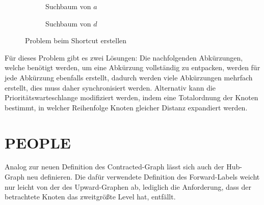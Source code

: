 \begin{figure}[h!]
\begin{subfigure}[b]{0.49\textwidth}
    \caption{Suchbaum von $a$}
  \end{subfigure}
  \hfill
  \begin{subfigure}[b]{0.49\textwidth}
    \centering
    \caption{Suchbaum von $d$}
  \end{subfigure}
  \caption{Problem beim Shortcut erstellen}
  \label{ch:fig:problem_shortcut}
\end{figure}

Für dieses Problem gibt es zwei Lösungen:
Die nachfolgenden Abkürzungen, welche benötigt werden, um eine Abkürzung vollständig zu entpacken, werden für jede Abkürzung ebenfalls erstellt, dadurch werden viele Abkürzungen mehrfach erstellt, dies muss daher synchronisiert werden.
Alternativ kann die Prioritätswarteschlange modifiziert werden, indem eine Totalordnung der Knoten bestimmt, in welcher Reihenfolge Knoten gleicher Distanz expandiert werden.

\section{PEOPLE}

Analog zur neuen Definition des Contracted-Graph lässt sich auch der Hub-Graph neu definieren.
Die dafür verwendete Definition des Forward-Labels weicht nur leicht von der des Upward-Graphen ab, lediglich die Anforderung, dass der betrachtete Knoten das zweitgrößte Level hat, entfällt.


